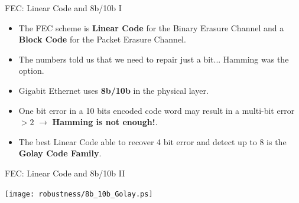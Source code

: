 \documentclass[compress,red]{beamer}
\begin{document}
\begin{frame}{FEC: Linear Code and 8b/10b I}

  \begin{itemize}
    \item The FEC scheme is \textbf{Linear Code} for the Binary Erasure
    Channel and a \textbf{Block Code} for the Packet Erasure Channel. 
    \item The numbers told us that we need to repair just a bit... Hamming was the option.
    \item Gigabit Ethernet uses \textbf{8b/10b} in the physical layer. 
    \item One bit error in a 10 bits encoded code word may result in a multi-bit
    error $>2$ $\rightarrow$
    \textbf{Hamming is not enough!}.
    \item The best Linear Code able to recover 4 bit error and detect up to 8 is
    the \textbf{Golay Code Family}.
  \end{itemize}
\end{frame}

\begin{frame}{FEC: Linear Code and 8b/10b II}
 
 \begin{center}
 \texttt{[image: robustness/8b\_10b\_Golay.ps]}
 \end{center}

\end{frame}
\end{document}
